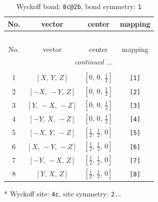 \documentclass[fleqn,8pt]{jsarticle}
\begin{document}
\begin{longtable}{cccc}
\caption{Wyckoff bond: {\tt 8c@2b}, bond symmetry: {\tt 1}}
 \\
 \hline \hline
No. & vector & center & mapping \\ \hline \endfirsthead

\multicolumn{3}{l}{\tablename\ \thetable{}} \\
 \hline \hline
No. & vector & center & mapping \\ \hline \endhead

 \hline \hline
\multicolumn{3}{r}{\footnotesize\it continued ...} \\ \endfoot

 \hline \hline
\multicolumn{3}{r}{} \\ \endlastfoot

1 & $\left[ X,\, Y,\, Z \right]$ & $\left[ 0,\, 0,\, \frac{1}{2} \right]$ & {\tt [1]} \\ \hline
2 & $\left[ - X,\, - Y,\, Z \right]$ & $\left[ 0,\, 0,\, \frac{1}{2} \right]$ & {\tt [2]} \\ \hline
3 & $\left[ Y,\, - X,\, - Z \right]$ & $\left[ 0,\, 0,\, \frac{1}{2} \right]$ & {\tt [3]} \\ \hline
4 & $\left[ - Y,\, X,\, - Z \right]$ & $\left[ 0,\, 0,\, \frac{1}{2} \right]$ & {\tt [4]} \\ \hline
5 & $\left[ - X,\, Y,\, - Z \right]$ & $\left[ \frac{1}{2},\, \frac{1}{2},\, 0 \right]$ & {\tt [5]} \\ \hline
6 & $\left[ X,\, - Y,\, - Z \right]$ & $\left[ \frac{1}{2},\, \frac{1}{2},\, 0 \right]$ & {\tt [6]} \\ \hline
7 & $\left[ - Y,\, - X,\, Z \right]$ & $\left[ \frac{1}{2},\, \frac{1}{2},\, 0 \right]$ & {\tt [7]} \\ \hline
8 & $\left[ Y,\, X,\, Z \right]$ & $\left[ \frac{1}{2},\, \frac{1}{2},\, 0 \right]$ & {\tt [8]} \\
\end{longtable}
* Wyckoff site: {\tt 4c}, site symmetry: {\tt 2..}
\renewcommand{\arraystretch}{1.2}
\end{document}
